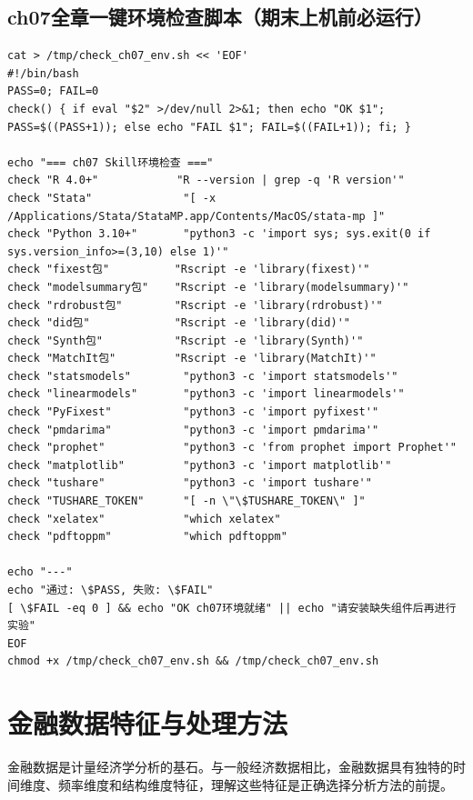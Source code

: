 \subsection{ch07全章一键环境检查脚本（期末上机前必运行）}

\begin{lstlisting}[style=shell]
cat > /tmp/check_ch07_env.sh << 'EOF'
#!/bin/bash
PASS=0; FAIL=0
check() { if eval "$2" >/dev/null 2>&1; then echo "OK $1"; PASS=$((PASS+1)); else echo "FAIL $1"; FAIL=$((FAIL+1)); fi; }

echo "=== ch07 Skill环境检查 ==="
check "R 4.0+"            "R --version | grep -q 'R version'"
check "Stata"              "[ -x /Applications/Stata/StataMP.app/Contents/MacOS/stata-mp ]"
check "Python 3.10+"       "python3 -c 'import sys; sys.exit(0 if sys.version_info>=(3,10) else 1)'"
check "fixest包"          "Rscript -e 'library(fixest)'"
check "modelsummary包"    "Rscript -e 'library(modelsummary)'"
check "rdrobust包"        "Rscript -e 'library(rdrobust)'"
check "did包"             "Rscript -e 'library(did)'"
check "Synth包"           "Rscript -e 'library(Synth)'"
check "MatchIt包"         "Rscript -e 'library(MatchIt)'"
check "statsmodels"        "python3 -c 'import statsmodels'"
check "linearmodels"       "python3 -c 'import linearmodels'"
check "PyFixest"           "python3 -c 'import pyfixest'"
check "pmdarima"           "python3 -c 'import pmdarima'"
check "prophet"            "python3 -c 'from prophet import Prophet'"
check "matplotlib"         "python3 -c 'import matplotlib'"
check "tushare"            "python3 -c 'import tushare'"
check "TUSHARE_TOKEN"      "[ -n \"\$TUSHARE_TOKEN\" ]"
check "xelatex"            "which xelatex"
check "pdftoppm"           "which pdftoppm"

echo "---"
echo "通过: \$PASS, 失败: \$FAIL"
[ \$FAIL -eq 0 ] && echo "OK ch07环境就绪" || echo "请安装缺失组件后再进行实验"
EOF
chmod +x /tmp/check_ch07_env.sh && /tmp/check_ch07_env.sh
\end{lstlisting}

\section{金融数据特征与处理方法}

金融数据是计量经济学分析的基石。与一般经济数据相比，金融数据具有独特的时间维度、频率维度和结构维度特征，理解这些特征是正确选择分析方法的前提。

